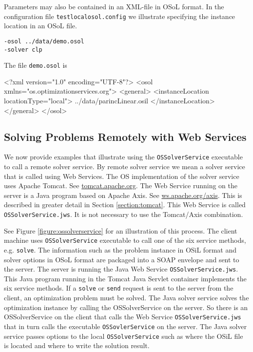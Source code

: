 \documentclass[11pt]{article}
\newcounter{Fig}
\renewcommand{\_}{{\char"5F}}
\renewcommand{\{}{{\char"7B}}
\renewcommand{\}}{{\char"7D}}
\renewcommand{\^}{{\char"0D}}
\renewcommand{\'}{{\char"0D}}
\begin{document}
Parameters may also be contained in an XML-file in OSoL format. In the configuration file {\tt testlocalosol.config} we illustrate specifying the instance location in an OSoL file.
\begin{verbatim}
-osol ../data/demo.osol
-solver clp
\end{verbatim}
The file {\tt demo.osol} is

\begin{verbatimtab}[4]
<?xml version="1.0" encoding="UTF-8"?>
<osol xmlns="os.optimizationservices.org">
	<general>         
		<instanceLocation locationType="local">
			../data/parincLinear.osil
		</instanceLocation>
	</general>
</osol>
\end{verbatimtab}

\subsection{Solving Problems Remotely with Web Services}

We now provide examples that illustrate using the {\tt OSSolverService} executable to call a remote solver service.   By remote solver service we mean a solver service that is called using Web Services.  The OS implementation  of the solver service  uses Apache Tomcat. See \url{tomcat.apache.org}. The Web Service running on the server is a Java program based on Apache Axis. See \url{ws.apache.org/axis}. This is described in greater detail in Section \ref{section:tomcat}.  This Web Service is called {\tt OSSolverService.jws}. It is not necessary to use the Tomcat/Axis combination.



See Figure \ref{figure:ossolverservice} for an illustration of this process. The client machine uses {\tt OSSolverService} executable to call one of the six service methods, e.g. {\tt solve}. The  information such as the problem instance in OSiL format and solver options in OSoL format are packaged into a SOAP envelope and sent to the server. The server is running the Java Web Service {\tt OSSolverService.jws}. This Java program running in the Tomcat Java Servlet container implements the six service methods. If a {\tt solve} or {\tt send} request is sent to the server from the client, an optimization problem must be solved. The Java solver service solves the optimization instance by  calling the  OSSolverService on the server. So there is an OSSolverService on the client that calls the Web Service {\tt  OSSolverService.jws} that in turn calls  the executable {\tt OSSovlerService} on the server. The Java solver service passes options to the local {\tt OSSolverService} such as where the OSiL file is located and where to write the solution result.
\end{document}
